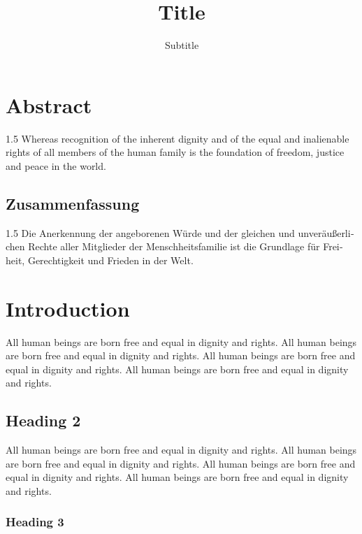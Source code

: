 \documentclass[
  ngerman,
  american,
  titlepage,
  openright,
  DIV=calc,
  toc=listof,
  listof=nochaptergap]{scrbook}
\title{Title}
\subtitle{Subtitle}
\author{}
\date{}
\begin{document}
\frontmatter
\maketitle

\chapter*{Abstract}
\begin{spacing}{1.5}
Whereas recognition of the inherent dignity and of the equal and inalienable rights of all members of the human family is the foundation of freedom, justice and peace in the world.
\end{spacing}

\begin{otherlanguage}{german}
\chapter*{Zusammenfassung}
\begin{spacing}{1.5}
Die Anerkennung der angeborenen Würde und der gleichen und unveräußerlichen Rechte aller Mitglieder der Menschheitsfamilie ist die Grundlage für Freiheit, Gerechtigkeit und Frieden in der Welt.
\end{spacing}
\end{otherlanguage}


\mainmatter
\chapter{Introduction}\label{sec-introduction}

All human beings are born free and equal in dignity and rights. All
human beings are born free and equal in dignity and rights. All human
beings are born free and equal in dignity and rights. All human beings
are born free and equal in dignity and rights.

\section{Heading 2}\label{heading-2}

All human beings are born free and equal in dignity and rights. All
human beings are born free and equal in dignity and rights. All human
beings are born free and equal in dignity and rights. All human beings
are born free and equal in dignity and rights.

\subsection{Heading 3}\label{heading-3}
\end{document}
